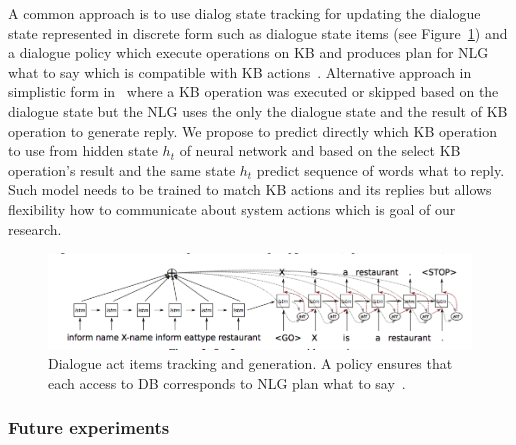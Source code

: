 \documentclass[11pt]{article}
\begin{document}
A common approach is to use dialog state tracking for updating the dialogue state represented in discrete form such as dialogue state items (see Figure~\ref{fig:dai_gen}) and a dialogue policy which execute operations on KB and produces plan for NLG what to say which is compatible with KB actions~\cite{dusek_sequence2sequence_2016,young2010hidden}.
Alternative approach in simplistic form in~\cite{wen_networkbased_2016} where a KB operation was executed or skipped based on the dialogue state but the NLG uses the only the dialogue state and the result of KB operation to generate reply.
We propose to predict directly which KB operation to use from hidden state $h_t$ of neural network and based on the select KB operation's result and the same state $h_t$ predict sequence of words what to reply.
Such model needs to be trained to match KB actions and its replies but allows flexibility how to communicate about system actions which is goal of our research.

\begin{figure}[htpb]
    \centering
    \includegraphics[width=1.0\linewidth]{dusek_seq2seq}
    \caption{Dialogue act items tracking and generation. A policy ensures that each access to DB corresponds to NLG plan what to say~\cite{dusek_sequence2sequence_2016}.}
    \label{fig:dai_gen}
\end{figure}

\subsubsection*{Future experiments}
\end{document}
